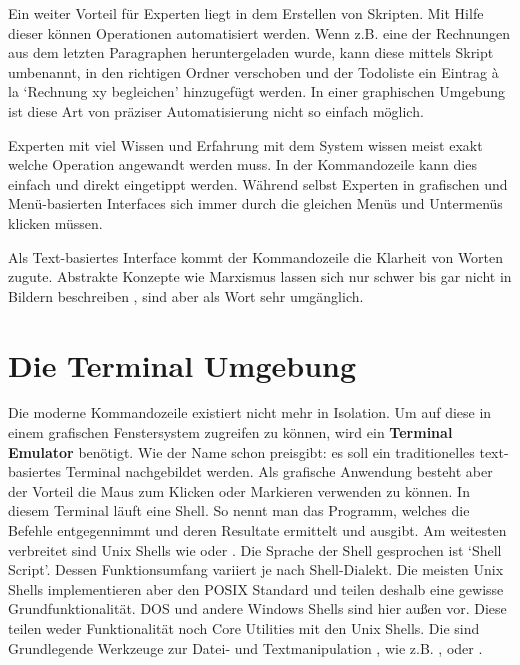 \documentclass[oneside,bibliography=totocnumbered,BCOR=5mm]{scrbook}
\begin{document}
Ein weiter Vorteil für Experten liegt in dem Erstellen von Skripten. Mit Hilfe
dieser können Operationen automatisiert werden. Wenn z.B. eine der Rechnungen
aus dem letzten Paragraphen heruntergeladen wurde, kann diese mittels Skript
umbenannt, in den richtigen Ordner verschoben und der Todoliste ein Eintrag à la
`Rechnung xy begleichen' hinzugefügt werden. In einer graphischen Umgebung ist
diese Art von präziser Automatisierung nicht so einfach möglich.

Experten mit viel Wissen und Erfahrung mit dem System wissen meist exakt
welche Operation angewandt werden muss. In der Kommandozeile kann dies einfach
und direkt eingetippt werden. Während selbst Experten in grafischen und
Menü-basierten Interfaces sich immer durch die gleichen Menüs und Untermenüs
klicken müssen.

Als Text-basiertes Interface kommt der Kommandozeile die Klarheit von Worten
zugute. Abstrakte Konzepte wie Marxismus lassen sich nur schwer bis gar nicht in
Bildern beschreiben \parencite{Raskin_2008}, sind aber als Wort sehr umgänglich.

\section{Die Terminal Umgebung}

Die moderne Kommandozeile existiert nicht mehr in Isolation. Um auf diese in
einem grafischen Fenstersystem zugreifen zu können, wird ein \textbf{Terminal
Emulator} benötigt. Wie der Name schon preisgibt: es soll ein traditionelles
text-basiertes Terminal nachgebildet werden. Als grafische Anwendung besteht
aber der Vorteil die Maus zum Klicken oder Markieren verwenden zu können. In
diesem Terminal läuft eine Shell. So nennt man das Programm, welches die Befehle
entgegennimmt und deren Resultate ermittelt und ausgibt. Am weitesten verbreitet
sind Unix Shells wie  oder .
Die Sprache der Shell gesprochen ist `Shell Script'. Dessen Funktionsumfang
variiert je nach Shell-Dialekt. Die meisten Unix Shells implementieren aber den
POSIX Standard und teilen deshalb eine gewisse Grundfunktionalität. DOS und
andere Windows Shells sind hier außen vor. Diese teilen weder Funktionalität
noch Core Utilities mit den Unix Shells. Die  sind
Grundlegende Werkzeuge zur Datei- und Textmanipulation \parencite{coreutils},
wie z.B. ,  oder .

\end{document}
